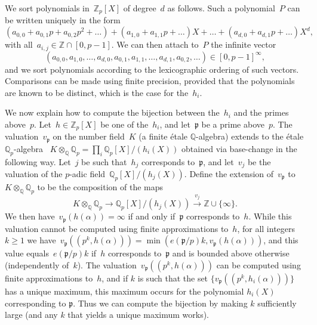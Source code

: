 \documentclass{article}
\def\Z{{\mathbb Z}}
\def\Q{{\mathbb Q}}
\def\p{{\mathfrak p}}
\DeclareMathOperator{\disc}{disc}
\begin{document}
We sort polynomials in~$\Z_p[X]$ of degree~$d$ as follows. Such a polynomial~$P$
can be written uniquely in the form
\[
  (a_{0,0}+a_{0,1}p+a_{0,2}p^2+\dots) + (a_{1,0}+a_{1,1}p+\dots)X
  + \dots + (a_{d,0}+a_{d,1}p+\dots)X^d,
\]
with all~$a_{i,j}\in\Z\cap[0,p-1]$. We can then attach to~$P$ the infinite
vector
\[
(a_{0,0},a_{1,0},\dots,a_{d,0},a_{0,1},a_{1,1},\dots,a_{d,1},a_{0,2},\dots)\in [0,p-1]^\infty,
\]
and we sort polynomials according to the lexicographic ordering of such vectors.
Comparisons can be made using finite precision, provided that the polynomials are known to be
distinct, which is the case for the~$h_i$.


We now explain how to compute the bijection between the~$h_i$ and the primes
above~$p$. Let~$h\in\Z_p[X]$ be one of the~$h_i$, and let~$\p$ be a prime
above~$p$. The valuation~$v_{\p}$ on the number field~$K$ (a finite \'etale $\Q$-algebra) extends to the \'etale $\Q_p$-algebra ~$K\otimes_{\Q}\Q_p = \prod_i
\Q_p[X]/(h_i(X))$ obtained via base-change in the following way.
Let~$j$ be such that~$h_{j}$ corresponds
to~$\p$, and let~$v_j$ be the valuation of the $p$-adic field~$\Q_p[X]/(h_j(X))$.
Define the extension of~$v_\p$ to $K\otimes_\Q\Q_p$ to be the composition of the maps
\[
  K\otimes_{\Q}\Q_p \longrightarrow \Q_p[X]/(h_j(X)) \stackrel{v_j}{\longrightarrow} \Z\cup\{\infty\}.
\]
We then have~$v_{\p}(h(\alpha)) = \infty$ if and only
if~$\p$ corresponds to~$h$.
While this valuation cannot be computed using finite
approximations to~$h$, for all integers~$k\ge 1$ we have~$v_\p((p^k,h(\alpha)))
= \min(e(\p/p)k, v_\p(h(\alpha)))$, and this value equals~$e(\p/p)k$
if~$h$ corresponds to~$\p$ and is bounded above otherwise (independently of~$k$). The
valuation~$v_\p((p^k,h(\alpha)))$ can be computed using finite approximations
to~$h$, and if $k$ is such that the set $\{v_\p((p^k,h_i(\alpha)))\}$ has a unique maximum, this maximum occurs for the polynomial $h_i(X)$ corresponding to $\p$.
Thus we can compute the bijection by making $k$ sufficiently large (and any $k$ that yields a unique maximum works).
\end{document}
